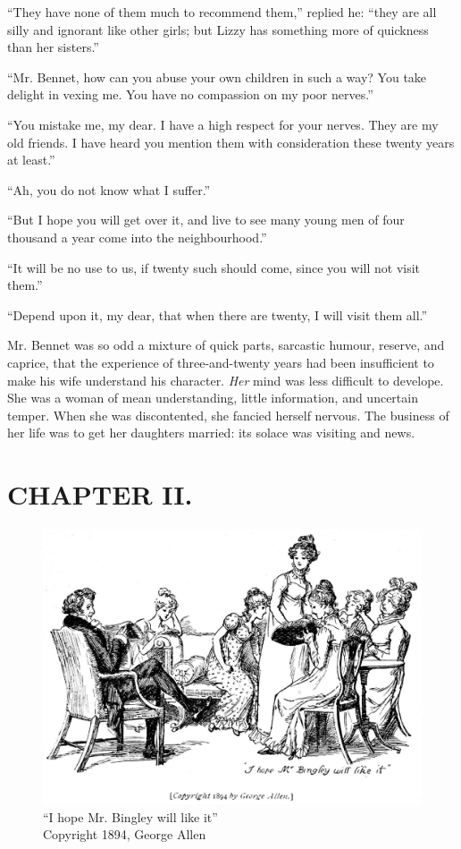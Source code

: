 ``They have none of them much to recommend them,'' replied he: ``they are all silly and ignorant like other girls; but Lizzy has something more of quickness than her sisters.''

``Mr. Bennet, how can you abuse your own children in such a way? You take delight in vexing me. You have no compassion on my poor nerves.''

``You mistake me, my dear. I have a high respect for your nerves. They are my old friends. I have heard you mention them with consideration these twenty years at least.''

``Ah, you do not know what I suffer.''

``But I hope you will get over it, and live to see many young men of four thousand a year come into the neighbourhood.''

``It will be no use to us, if twenty such should come, since you will not visit them.''

``Depend upon it, my dear, that when there are twenty, I will visit them all.''

Mr. Bennet was so odd a mixture of quick parts, sarcastic humour, reserve, and caprice, that the experience of three-and-twenty years had been insufficient to make his wife understand his character. \textit{Her} mind was less difficult to develope. She was a woman of mean understanding, little information, and uncertain temper. When she was discontented, she fancied herself nervous. The business of her life was to get her daughters married: its solace was visiting and news.

\chapter{CHAPTER II.}

\begin{figure}[htbp]
    \centering
    \includegraphics[width=\textwidth]{illustrations/i_035_a.jpg}
    \caption{“I hope Mr. Bingley will like it”\\ Copyright 1894, George Allen}
    \label{fig:image1}
\end{figure}

